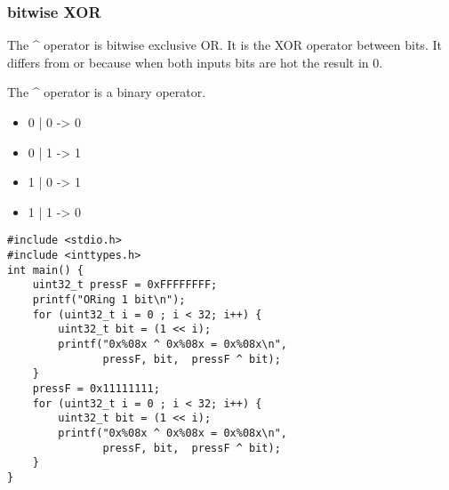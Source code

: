 \documentclass[11pt]{article}
\begin{document}
\subsubsection{bitwise XOR}
\label{sec:org8f82edb}

The \^{} operator is bitwise exclusive OR. It is the XOR operator between
bits. It differs from or because when both inputs bits are hot the
result in 0.

The \^{} operator is a binary operator.

\begin{itemize}
\item 0 | 0 -> 0
\item 0 | 1 -> 1
\item 1 | 0 -> 1
\item 1 | 1 -> 0
\end{itemize}

\begin{verbatim}
#include <stdio.h>
#include <inttypes.h>
int main() {  
    uint32_t pressF = 0xFFFFFFFF;
    printf("ORing 1 bit\n");
    for (uint32_t i = 0 ; i < 32; i++) {
        uint32_t bit = (1 << i);
        printf("0x%08x ^ 0x%08x = 0x%08x\n",
               pressF, bit,  pressF ^ bit);
    }
    pressF = 0x11111111;
    for (uint32_t i = 0 ; i < 32; i++) {
        uint32_t bit = (1 << i);
        printf("0x%08x ^ 0x%08x = 0x%08x\n",
               pressF, bit,  pressF ^ bit);
    }
}
\end{verbatim}
\end{document}
